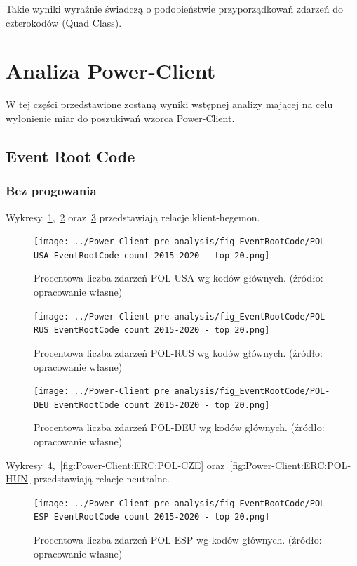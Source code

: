 \documentclass[11pt]{report}
\begin{document}
    Takie wyniki wyraźnie świadczą o podobieństwie przyporządkowań zdarzeń do czterokodów (Quad Class).


    \section{Analiza Power-Client}
    W tej części przedstawione zostaną wyniki wstępnej analizy mającej na celu wyłonienie miar
    do poszukiwań wzorca Power-Client.

    \subsection{Event Root Code}

    \subsubsection{Bez progowania}
    Wykresy~\ref{fig:Power-Client:ERC:POL-USA},~\ref{fig:Power-Client:ERC:POL-RUS} oraz~\ref{fig:Power-Client:ERC:POL-DEU} przedstawiają relacje klient-hegemon.
    \begin{figure}[!htp]
        \centering
        \texttt{[image: ../Power-Client pre analysis/fig\_EventRootCode/POL-USA EventRootCode count 2015-2020 - top 20.png]}
        \caption{Procentowa liczba zdarzeń POL-USA wg kodów głównych. (źródło: opracowanie własne)}
        \label{fig:Power-Client:ERC:POL-USA}
    \end{figure}

    \begin{figure}[!htp]
        \centering
        \texttt{[image: ../Power-Client pre analysis/fig\_EventRootCode/POL-RUS EventRootCode count 2015-2020 - top 20.png]}
        \caption{Procentowa liczba zdarzeń POL-RUS wg kodów głównych. (źródło: opracowanie własne)}
        \label{fig:Power-Client:ERC:POL-RUS}
    \end{figure}

    \begin{figure}[!htp]
        \centering
        \texttt{[image: ../Power-Client pre analysis/fig\_EventRootCode/POL-DEU EventRootCode count 2015-2020 - top 20.png]}
        \caption{Procentowa liczba zdarzeń POL-DEU wg kodów głównych. (źródło: opracowanie własne)}
        \label{fig:Power-Client:ERC:POL-DEU}
    \end{figure}

    Wykresy~\ref{fig:Power-Client:ERC:POL-ESP},~\ref{fig:Power-Client:ERC:POL-CZE} oraz~\ref{fig:Power-Client:ERC:POL-HUN} przedstawiają relacje neutralne.
    \begin{figure}[!htp]
        \centering
        \texttt{[image: ../Power-Client pre analysis/fig\_EventRootCode/POL-ESP EventRootCode count 2015-2020 - top 20.png]}
        \caption{Procentowa liczba zdarzeń POL-ESP wg kodów głównych. (źródło: opracowanie własne)}
        \label{fig:Power-Client:ERC:POL-ESP}
    \end{figure}
\end{document}
